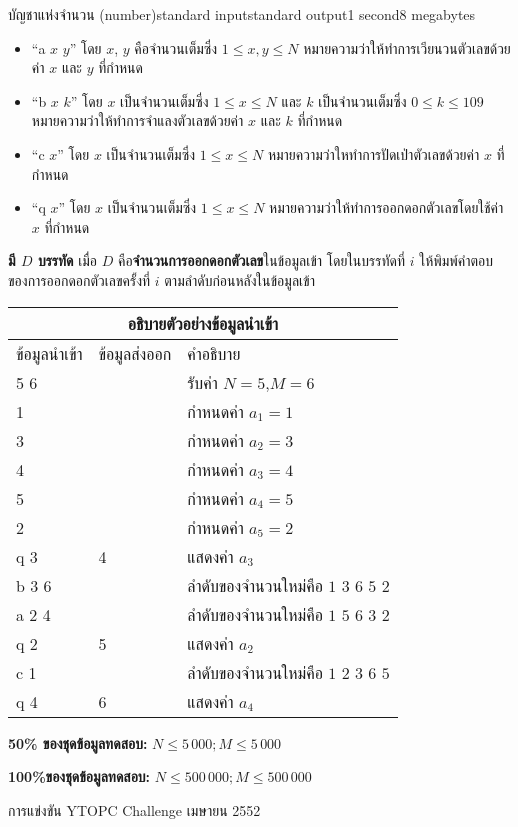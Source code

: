 \documentclass[11pt,a4paper]{article}
\begin{document}
\begin{problem}{บัญชาแห่งจำนวน (number)}{standard input}{standard output}{1 second}{8 megabytes}
\begin{itemize}

\item “a $x$ $y$”  โดย $x$, $y$ คือจำนวนเต็มซึ่ง $1 \leq x, y \leq N$ หมายความว่าให้ทำการเวียนวนตัวเลขด้วยค่า $x$ และ $y$ ที่กำหนด
\item “b $x$ $k$”  โดย $x$ เป็นจำนวนเต็มซึ่ง $1 \leq x \leq N$ และ $k$ เป็นจำนวนเต็มซึ่ง $0 \leq k \leq 109$ หมายความว่าให้ทำการจำแลงตัวเลขด้วยค่า $x$ และ $k$ ที่กำหนด
\item “c $x$”  โดย $x$ เป็นจำนวนเต็มซึ่ง $1 \leq x \leq N$ หมายความว่าใหทำการปัดเป่าตัวเลขด้วยค่า $x$ ที่กำหนด
\item “q $x$” โดย $x$ เป็นจำนวนเต็มซึ่ง $1 \leq x \leq N$ หมายความว่าให้ทำการออกดอกตัวเลขโดยใช้ค่า $x$ ที่กำหนด
\end{itemize}

\OutputFile

\textbf{มี $D$ บรรทัด} เมื่อ $D$ คือ\textbf{จำนวนการออกดอกตัวเลข}ในข้อมูลเข้า โดยในบรรทัดที่ $i$ ให้พิมพ์คำตอบของการออกดอกตัวเลขครั้งที่ $i$ ตามลำดับก่อนหลังในข้อมูลเข้า

\Examples

\begin{example}
%
\end{example}

\Note 

\begin{tabular}{|l|l|l|}
\hline
\multicolumn{3}{|c|}{อธิบายตัวอย่างข้อมูลนำเข้า}\\
\hline
ข้อมูลนำเข้า&ข้อมูลส่งออก&คำอธิบาย\\
\hline
5 6&	 	&รับค่า $N = 5$,$M = 6$\\[1ex]
1	&& 	กำหนดค่า $a_1  = 1$\\[1ex]
3	&& 	กำหนดค่า $a_2  = 3$\\[1ex]
4	&& 	กำหนดค่า $a_3  = 4$\\[1ex]
5	&& 	กำหนดค่า $a_4  = 5$\\[1ex]
2	 &&	กำหนดค่า $a_5  = 2$\\[1ex]
q 3	&4	&แสดงค่า $a_3$\\[1ex]
b 3 6&	 &	ลำดับของจำนวนใหม่คือ $1$ $3$ $6$ $5$ $2$\\[1ex]
a 2 4&	 	&ลำดับของจำนวนใหม่คือ $1$ $5$ $6$ $3$ $2$\\[1ex]
q 2&	5&	แสดงค่า $a_2$\\[1ex]
c 1&&	 	ลำดับของจำนวนใหม่คือ $1$ $2$ $3$ $6$ $5$\\[1ex]
q 4&	6&	แสดงค่า $a_4$\\[1ex]
\hline
\end{tabular}

\Scoring

\textbf{50\% ของชุดข้อมูลทดสอบ:} $N \leq 5\,000 ;M \leq 5\,000$ 

\textbf{100\%ของชุดข้อมูลทดสอบ:} $N \leq 500\,000;M \leq 500\,000$


\Source

การแข่งขัน YTOPC Challenge เมษายน 2552


\end{problem}
\end{document}
